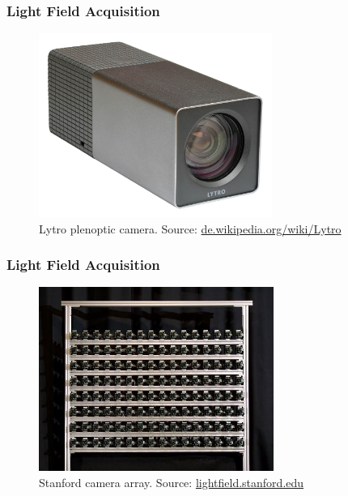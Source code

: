 \documentclass[12pt, compress]{beamer}
\begin{document}
\begin{frame}[fragile]
	\frametitle{Light Field Acquisition}
	
	\begin{figure}
		\captionsetup{font=scriptsize}
		\includegraphics[height = 6cm]{images/Lytro_Light_Field_Camera-front_background_removed.png}
		\caption*{Lytro plenoptic camera. Source: \href{https://de.wikipedia.org/wiki/Lytro}{de.wikipedia.org/wiki/Lytro}}
	\end{figure}
	
\end{frame}

\begin{frame}[fragile]
	\frametitle{Light Field Acquisition}
	
	\begin{figure}
		\captionsetup{font=scriptsize}
		\includegraphics[height = 6cm]{images/stanford_camera_array_2.jpg}
		\caption*{Stanford camera array. Source: \href{http://lightfield.stanford.edu}{lightfield.stanford.edu}}
	\end{figure}
	
\end{frame}
\end{document}
